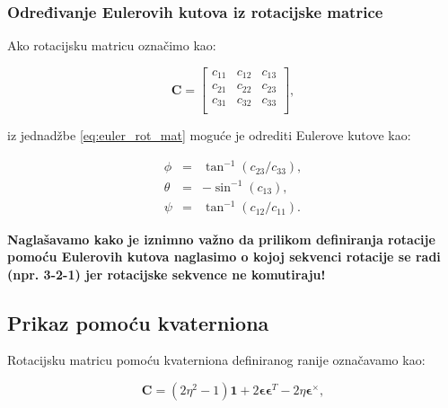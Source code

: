 \documentclass[times, utf8, diplomski, numeric]{templates/template}
\begin{document}
{{{            \subsubsection{Određivanje Eulerovih kutova iz rotacijske matrice}{
                Ako rotacijsku matricu označimo kao:

                \begin{equation}
                \label{eq:rotation_matrix}
                \textbf{C} =
                \begin{bmatrix}
                    c_{11} & c_{12} & c_{13} \\
                    c_{21} & c_{22} & c_{23} \\
                    c_{31} & c_{32} & c_{33} \\
                \end{bmatrix}
                ,
                \end{equation}

                iz jednadžbe \ref{eq:euler_rot_mat} moguće je odrediti Eulerove kutove kao:

                \begin{equation}
                \begin{array}{rcl}
                    \phi   & = & \tan^{-1}(c_{23}/c_{33}),\\
                    \theta & = & -\sin^{-1}(c_{13}),\\
                    \psi   & = & \tan^{-1}(c_{12}/c_{11}).
                \end{array}
                \end{equation}
            }

            \textbf{Naglašavamo kako je iznimno važno da prilikom definiranja rotacije pomoću Eulerovih kutova naglasimo o kojoj sekvenci rotacije se radi (npr. 3-2-1) jer rotacijske sekvence ne komutiraju!}
        }

        \subsection{Prikaz pomoću kvaterniona}{
            Rotacijsku matricu pomoću kvaterniona definiranog ranije označavamo kao:

            \begin{equation}
                \textbf{C} = (2\eta^2-1)\textbf{1} + 2\boldsymbol\epsilon\boldsymbol\epsilon^{T}-2\eta\boldsymbol\epsilon^{\times},
            \end{equation}

}}}
\end{document}
